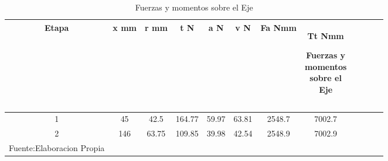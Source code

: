 \begin{longtable}{|c|c|c|c|c|c|c|c|c|c|c|c|}
\hline
Etapa & x mm  & r mm  & t N  & a N & v N & Fa Nmm  & Tt Nmm \begin{tabular}[c]{@{}c@{}}\end{tabular} \\ \hline
1          & 45      & 42.5 & 164.77  & 59.97 & 63.81 & 2548.7 & 7002.7 \\ \hline
2          & 146     & 63.75 & 109.85 & 39.98 & 42.54 & 2548.9 & 7002.9  \\ \hline

\caption{ Fuerzas y momentos sobre el Eje}{Fuente:Elaboracion Propia}
\label{table:fuerzas eje}
\end{longtable}